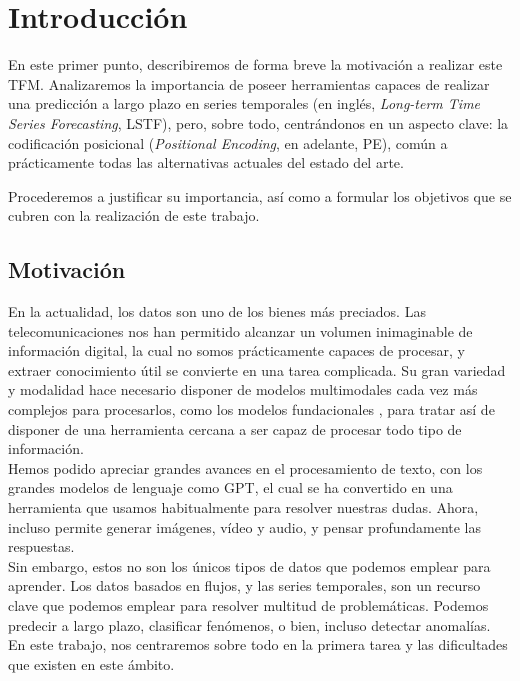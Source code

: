 \chapter{Introducción}

En este primer punto, describiremos de forma breve la motivación a realizar este TFM. Analizaremos la importancia de poseer herramientas capaces de realizar una predicción a largo plazo en series temporales (en inglés,\textit{ Long-term Time Series Forecasting},  LSTF), pero, sobre todo, centrándonos en un aspecto clave: la codificación posicional (\textit{Positional Encoding}, en adelante, PE), común a prácticamente todas las alternativas actuales del estado del arte. 

Procederemos a justificar su importancia, así como a formular los objetivos que se cubren con la realización de este trabajo.
\section{Motivación}

En la actualidad, los datos son uno de los bienes más preciados. Las telecomunicaciones nos han permitido alcanzar un volumen inimaginable de información digital, la cual no somos prácticamente capaces de procesar, y extraer conocimiento útil se convierte en una tarea complicada. Su gran variedad y modalidad hace necesario disponer de modelos multimodales cada vez más complejos para procesarlos, como los modelos fundacionales \cite{bommasani2022opportunitiesrisksfoundationmodels}, para tratar así de disponer de una herramienta cercana a ser capaz de procesar todo tipo de información.\\

Hemos podido apreciar grandes avances en el procesamiento de texto, con los grandes modelos de lenguaje como GPT, el cual se ha convertido en una herramienta que usamos habitualmente para resolver nuestras dudas. Ahora, incluso permite generar imágenes, vídeo y audio, y pensar profundamente las respuestas.\\

Sin embargo, estos no son los únicos tipos de datos que podemos emplear para aprender. Los datos basados en flujos, y las series temporales, son un recurso clave que podemos emplear para resolver multitud de problemáticas. Podemos predecir a largo plazo, clasificar fenómenos, o bien, incluso detectar anomalías. En este trabajo, nos centraremos sobre todo en la primera tarea y las dificultades que existen en este ámbito.

